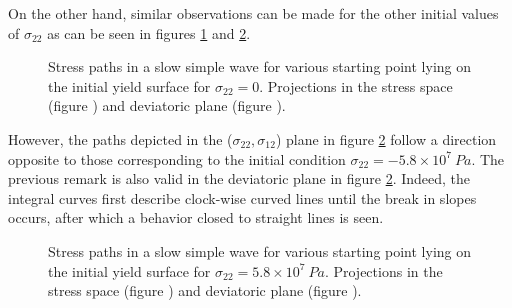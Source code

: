 On the other hand, similar observations can be made for the other initial values of $\sigma_{22}$ as can be seen in figures \ref{fig:slow_path_plane_stress2} and \ref{fig:slow_path_plane_stress3}.
\begin{figure}[h!]
  \centering
  \caption{Stress paths in a slow simple wave for various starting point lying on the initial yield surface for $\sigma_{22}=0$. Projections in the stress space (figure ) and deviatoric plane (figure ).}
  \label{fig:slow_path_plane_stress2}
\end{figure}
However, the paths depicted in the ($\sigma_{22},\sigma_{12}$) plane in figure \ref{fig:slow_path_plane_stress3} follow a direction opposite to those corresponding to the initial condition $\sigma_{22}=-5.8\times 10^7 \: Pa$.
The previous remark is also valid in the deviatoric plane in figure \ref{fig:slow_path_plane_stress3}.
Indeed, the integral curves first describe clock-wise curved lines until the break in slopes occurs, after which a behavior closed to straight lines is seen.
\begin{figure}[h!]
  \centering
  \caption{Stress paths in a slow simple wave for various starting point lying on the initial yield surface for $\sigma_{22}=5.8\times 10^7 \: Pa$. Projections in the stress space (figure ) and deviatoric plane (figure ).}
  \label{fig:slow_path_plane_stress3}
\end{figure}

